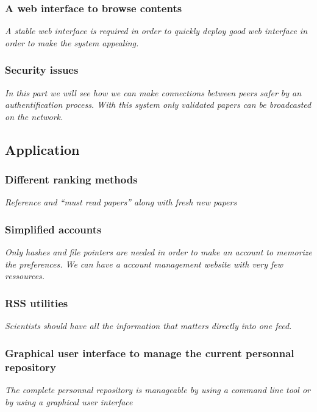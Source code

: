 \subsubsection{A web interface to browse contents}

\textit{A stable web interface is required in order to
quickly deploy good web interface in order to make the system
appealing.}

\subsubsection{Security issues}

\textit{In this part we will see how we can make connections
between peers safer by an authentification process. With this
system only validated papers can be broadcasted on the network.}

\subsection{Application}

\subsubsection{Different ranking methods}

\textit{Reference and ``must read papers'' along with fresh new papers}

\subsubsection{Simplified accounts}

\textit{Only hashes and file pointers are needed in order to make an
account to memorize the preferences. We can have a account management
website with very few ressources.}

\subsubsection{RSS utilities}

\textit{Scientists should have all the information that matters directly into
one feed.}

\subsubsection{Graphical user interface to manage the current personnal repository}

\textit{The complete personnal repository is manageable by using a command line
tool or by using a graphical user interface}

